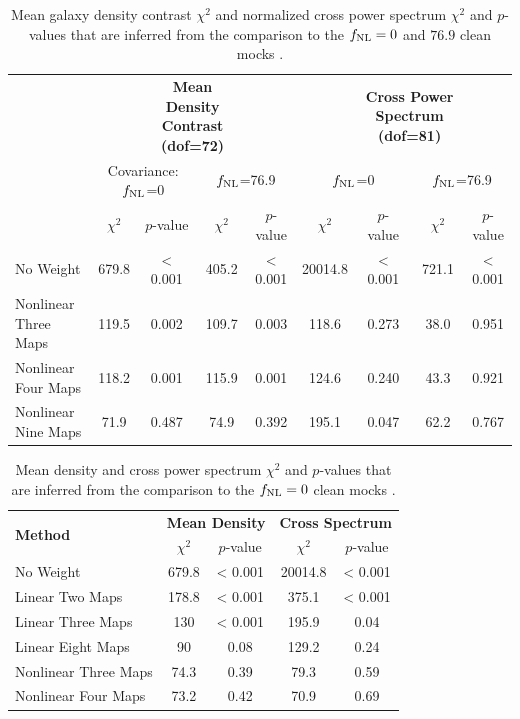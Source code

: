 \begin{table}
  \caption{Mean galaxy density contrast $\chi^{2}$ and normalized cross power spectrum $\chi^{2}$  and $p$-values that are inferred from the comparison to the $f_{\rm NL}=0$ and $76.9$ clean mocks .}\label{tab:chi2test}
  \begin{tabular}{lcccc|cccc}
    \hline
    \hline
    \multirow{3}{*}{} &&
      \multicolumn{2}{c}{\textbf{Mean Density Contrast (dof=72)}} & & &
      \multicolumn{2}{c}{\textbf{Cross Power Spectrum (dof=81)}} \\
    & \multicolumn{2}{c}{Covariance: $f_{\rm NL}$=0} & \multicolumn{2}{c}{$f_{\rm NL}$=76.9} & \multicolumn{2}{c}{$f_{\rm NL}$=0} & \multicolumn{2}{c}{$f_{\rm NL}$=76.9} \\
    \hline
    \textbf{Method} & $\chi^{2}$ & $p$-value & $\chi^{2}$ & $p$-value & $\chi^{2}$ & $p$-value & $\chi^{2}$ & $p$-value \\
    \hline
No Weight & 679.8 & < 0.001 & 405.2 & < 0.001 & 20014.8 & < 0.001 & 721.1 & < 0.001 \\
Nonlinear Three Maps & 119.5 & 0.002 & 109.7 & 0.003 & 118.6 & 0.273 & 38.0 & 0.951 \\
Nonlinear Four Maps & 118.2 & 0.001 & 115.9 & 0.001 & 124.6 & 0.240 & 43.3 & 0.921 \\
Nonlinear Nine Maps & 71.9 & 0.487 & 74.9 & 0.392 & 195.1 & 0.047 & 62.2 & 0.767 \\
    \hline
  \end{tabular}
\end{table}


\begin{table}
  \caption{Mean density and cross power spectrum $\chi^{2}$ and $p$-values that are inferred from the comparison to the $f_{\rm NL}=0$ clean mocks .}
  \begin{tabular}{lcccc}
    \hline
    \hline
    \multirow{2}{*}{\textbf{Method}} &
      \multicolumn{2}{c}{\textbf{Mean Density}} &
      \multicolumn{2}{c}{\textbf{Cross Spectrum}} \\
    & $\chi^{2}$ & $p$-value & $\chi^{2}$ & $p$-value \\
    \hline
    
   No Weight & 679.8 & < 0.001 & 20014.8 & < 0.001 \\
   Linear Two Maps & 178.8 & < 0.001 & 375.1 & < 0.001 \\
   Linear Three Maps & 130 & < 0.001  & 195.9 & 0.04 \\
   Linear Eight Maps & 90 & 0.08  & 129.2 & 0.24 \\
   Nonlinear Three Maps & 74.3 & 0.39  & 79.3 & 0.59 \\
   Nonlinear Four Maps & 73.2 & 0.42  & 70.9 & 0.69\\  
    \hline
  \end{tabular}
\end{table}





